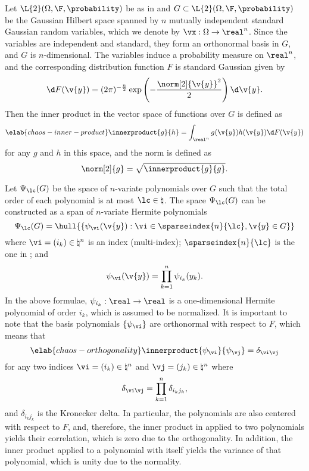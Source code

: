 Let $\L{2}(\Omega, \F, \probability)$ be as in 
and $G \subset \L{2}(\Omega, \F, \probability)$ be the Gaussian Hilbert space
\cite{janson1997} spanned by $n$ mutually independent standard Gaussian random
variables, which we denote by $\vx: \Omega \to \real^n$. Since the variables are
independent and standard, they form an orthonormal basis in $G$, and $G$ is
$n$-dimensional. The variables induce a probability measure on $\real^n$, and
the corresponding distribution function $F$ is standard Gaussian given by
\[
  \d F(\v{y}) = (2 \pi)^{-\frac{n}{2}} \exp\left(-\frac{\norm[2]{\v{y}}^2}{2}\right) \d \v{y}.
\]
Then the inner product in the vector space of functions over $G$ is defined as
\begin{equation} \elab{chaos-inner-product}
  \innerproduct{g}{h} = \int_{\real^n} g(\v{y}) h(\v{y}) \d F(\v{y})
\end{equation}
for any $g$ and $h$ in this space, and the norm is defined as
\[
  \norm[2]{g} = \sqrt{\innerproduct{g}{g}}.
\]

Let $\Psi_\lc(G)$ be the space of $n$-variate polynomials over $G$ such that the
total order of each polynomial is at most $\lc \in \natural$. The space
$\Psi_\lc(G)$ can be constructed as a span of $n$-variate Hermite polynomials
\cite{eldred2008, maitre2010}
\[
  \Psi_\lc(G) = \hull{\left\{ \psi_{\vi}(\v{y}): \vi \in \sparseindex{n}{\lc}, \v{y} \in G \right\}}
\]
where $\vi = (i_k) \in \natural^n$ is an index (multi-index);
$\sparseindex{n}{\lc}$ is the one in ; and
\[
  \psi_{\vi}(\v{y}) = \prod_{k = 1}^n \psi_{i_k}(y_k).
\]
In the above formulae, $\psi_{i_k}: \real \to \real$ is a one-dimensional
Hermite polynomial of order $i_k$, which is assumed to be normalized. It is
important to note that the basis polynomials $\{ \psi_{\vi} \}$ are orthonormal
with respect to $F$, which means that
\begin{equation} \elab{chaos-orthogonality}
  \innerproduct{\psi_{\vi}}{\psi_{\vj}} = \delta_{\vi \vj}
\end{equation}
for any two indices $\vi = (i_k) \in \natural^n$ and $\vj = (j_k) \in
\natural^n$ where
\[
  \delta_{\vi \vj} = \prod_{k = 1}^n \delta_{i_k j_k},
\]
and $\delta_{i_k j_k}$ is the Kronecker delta. In particular, the polynomials
are also centered with respect to $F$, and, therefore, the inner product in
 applied to two polynomials yields their correlation,
which is zero due to the orthogonality. In addition, the inner product applied
to a polynomial with itself yields the variance of that polynomial, which is
unity due to the normality.

